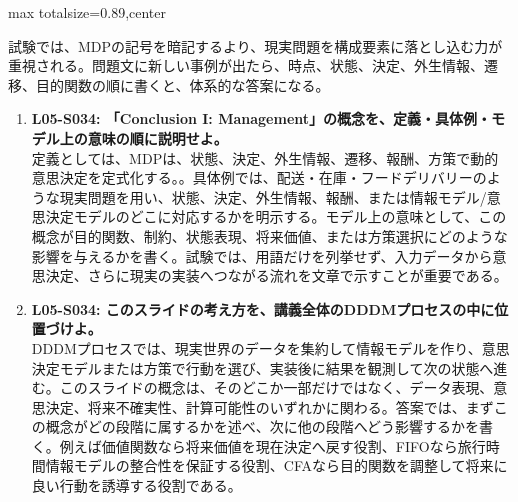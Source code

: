 \begin{minipage}[t]{0.58\textwidth}
\begin{adjustbox}{max totalsize={\textwidth}{0.89\textheight},center}
\begin{minipage}{\textwidth}
試験では、MDPの記号を暗記するより、現実問題を構成要素に落とし込む力が重視される。問題文に新しい事例が出たら、時点、状態、決定、外生情報、遷移、目的関数の順に書くと、体系的な答案になる。\par{}\begin{enumerate}\item \textbf{L05-S034: 「Conclusion I: Management」の概念を、定義・具体例・モデル上の意味の順に説明せよ。}\\定義としては、MDPは、状態、決定、外生情報、遷移、報酬、方策で動的意思決定を定式化する。。具体例では、配送・在庫・フードデリバリーのような現実問題を用い、状態、決定、外生情報、報酬、または情報モデル/意思決定モデルのどこに対応するかを明示する。モデル上の意味として、この概念が目的関数、制約、状態表現、将来価値、または方策選択にどのような影響を与えるかを書く。試験では、用語だけを列挙せず、入力データから意思決定、さらに現実の実装へつながる流れを文章で示すことが重要である。\item \textbf{L05-S034: このスライドの考え方を、講義全体のDDDMプロセスの中に位置づけよ。}\\DDDMプロセスでは、現実世界のデータを集約して情報モデルを作り、意思決定モデルまたは方策で行動を選び、実装後に結果を観測して次の状態へ進む。このスライドの概念は、そのどこか一部だけではなく、データ表現、意思決定、将来不確実性、計算可能性のいずれかに関わる。答案では、まずこの概念がどの段階に属するかを述べ、次に他の段階へどう影響するかを書く。例えば価値関数なら将来価値を現在決定へ戻す役割、FIFOなら旅行時間情報モデルの整合性を保証する役割、CFAなら目的関数を調整して将来に良い行動を誘導する役割である。\end{enumerate}
\end{minipage}
\end{adjustbox}
\end{minipage}


